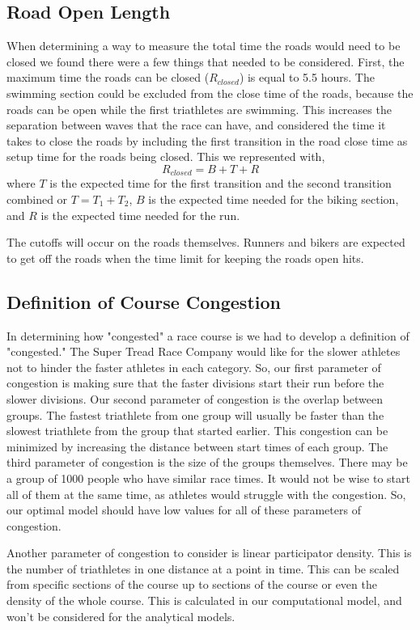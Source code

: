 \documentclass[12pt]{article}
\begin{document}
\subsection{Road Open Length}
When determining a way to measure the total time the roads would need to be closed we found there were a few things that needed to be considered. First, the maximum time the roads can be closed ($R_{closed}$) is equal to 5.5 hours. The swimming section could be excluded from the close time of the roads, because the roads can be open while the first triathletes are swimming. This increases the separation between waves that the race can have, and considered the time it takes to close the roads by including the first transition in the road close time as setup time for the roads being closed. This we represented with,
\[R_{closed} = B + T + R\]
where $T$ is the expected time for the first transition and the second transition combined or \(T = T_1 + T_2\), $B$ is the expected time needed for the biking section, and $R$ is the expected time needed for the run. 
\par{}
The cutoffs will occur on the roads themselves. Runners and bikers are expected to get off the roads when the time limit for keeping the roads open hits.
\subsection{Definition of Course Congestion}
In determining how "congested" a race course is we had to develop a definition of "congested." The Super Tread Race Company would like for the slower athletes not to hinder the faster athletes in each category. So, our first parameter of congestion is making sure that the faster divisions start their run before the slower divisions. Our second parameter of congestion is the overlap between groups. The fastest triathlete from one group will usually be faster than the slowest triathlete from the group that started earlier. This congestion can be minimized by increasing the distance between start times of each group. The third parameter of congestion is the size of the groups themselves. There may be a group of 1000 people who have similar race times. It would not be wise to start all of them at the same time, as athletes would struggle with the congestion. So, our optimal model should have low values for all of these parameters of congestion.

Another parameter of congestion to consider is linear participator density. This is the number of triathletes in one distance at a point in time. This can be scaled from specific sections of the course up to sections of the course or even the density of the whole course. This is calculated in our computational model, and won't be considered for the analytical models.
\end{document}
